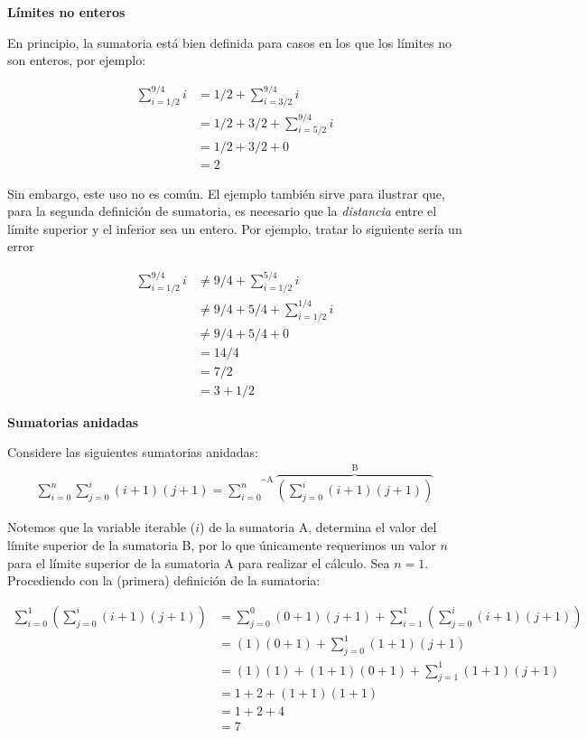 \textbf{Límites no enteros}

En principio, la sumatoria está bien definida para casos en los que los límites no son enteros, por ejemplo:

\begin{align*}
  \sum_{i=1/2}^{9/4} i &= 1/2 + \sum_{i=3/2}^{9/4} i \\
  &= 1/2 + 3/2 + \sum_{i=5/2}^{9/4} i\\
  &= 1/2 + 3/2 + 0\\
  &= 2
\end{align*}

Sin embargo, este uso no es común. El ejemplo también sirve para ilustrar que, para la segunda definición de sumatoria, es necesario que la \textit{distancia} entre el límite superior y el inferior sea un entero. Por ejemplo, tratar lo siguiente sería un error

\begin{align*}
  \sum_{i=1/2}^{9/4} i &\neq 9/4 + \sum_{i=1/2}^{5/4} i\\
  &\neq 9/4 + 5/4 + \sum_{i=1/2}^{1/4} i\\
  &\neq 9/4 + 5/4 + 0\\
  &= 14/4\\
  &= 7/2\\
  &= 3 + 1/2
\end{align*}

\textbf{Sumatorias anidadas}

Considere las siguientes sumatorias anidadas:
\begin{align*}
  \sum_{i=0}^{n} \sum_{j=0}^{i} (i+1)(j+1) = \overbrace{\sum_{i=0}^{n}}^{\text{A}} \overbrace{\left(\sum_{j=0}^{i} (i+1)(j+1)\right)}^{\text{B}}
\end{align*}

Notemos que la variable iterable ($i$) de la sumatoria A, determina el valor del límite superior de la sumatoria B, por lo que únicamente requerimos un valor $n$ para el límite superior de la sumatoria A para realizar el cálculo. Sea $n=1$. Procediendo con la (primera) definición de la sumatoria:

\begin{align*}
  \sum_{i=0}^{1} \left(\sum_{j=0}^{i}(i+1)(j+1)\right) &= \sum_{j=0}^{0} (0+1)(j+1) + \sum_{i=1}^{1} \left(\sum_{j=0}^{i}(i+1)(j+1)\right) \\
  &= (1)(0+1) + \sum_{j=0}^{1} (1+1) (j+1)\\
  &= (1)(1) + (1+1)(0+1) + \sum_{j=1}^{1} (1+1) (j+1)\\
  &= 1 + 2 + (1+1)(1+1)\\
  &= 1 + 2 + 4\\
  &= 7
\end{align*}

